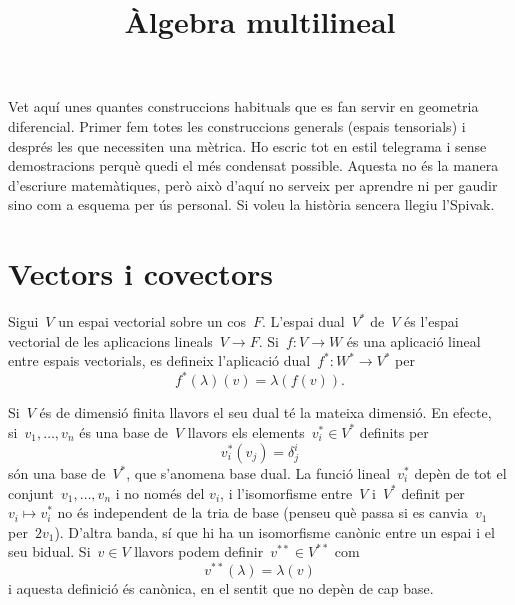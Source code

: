 \title{Àlgebra multilineal}


\newcommand{\R}{\mathbf{R}}
\newcommand{\Z}{\mathbf{Z}}
\newcommand{\Q}{\mathbf{Q}}
\newcommand{\C}{\mathbf{C}}
\newcommand{\U}{\mathbf{U}}
\newcommand{\ud}{\mathrm{d}}


Vet aquí unes quantes construccions habituals que es fan servir
en geometria diferencial.  Primer fem totes les construccions
generals (espais tensorials) i després les que necessiten una
mètrica.  Ho escric tot en estil telegrama i sense demostracions
perquè quedi el més condensat possible.  Aquesta no és la manera
d'escriure matemàtiques, però això d'aquí no serveix per aprendre ni
per gaudir sino com a esquema per ús personal.  Si voleu la història
sencera llegiu l'Spivak.

%

\section{Vectors i covectors}

Sigui~$V$ un espai vectorial sobre un cos~$F$.  L'espai dual~$V^*$ de~$V$ és
l'espai vectorial de les aplicacions lineals~$V\to F$.  Si~$f:V\to W$ és
una aplicació lineal entre espais vectorials, es defineix l'aplicació
dual~$f^*:W^*\to V^*$ per
\[
	f^*(λ)(v) = λ(f(v)).
\]

Si~$V$ és de dimensió finita llavors el seu dual té la mateixa
dimensió.  En efecte, si~$v_1,\dots,v_n$ és una base de~$V$ llavors els
elements~$v^*_i\in V^*$ definits per
\[
    v^*_i(v_j)=\delta^i_j
\]
són una base de~$V^*$, que s'anomena base dual. La funció
lineal~$v_i^*$ depèn de tot el conjunt~$v_1,\dots,v_n$ i no només del
$v_i$, i l'isomorfisme entre~$V$ i~$V^*$ definit per~$v_i\mapsto
v^*_i$ no és independent de la tria de base (penseu què passa si es
canvia~$v_1$ per~$2v_1$).  D'altra banda, sí que hi ha un isomorfisme
canònic entre un espai i el seu bidual.  Si~$v\in V$ llavors podem
definir~$v^{**}\in V^{**}$ com
\[
	v^{**} (λ) = λ(v)
\]
i aquesta definició és canònica, en el sentit que no depèn de cap base.




